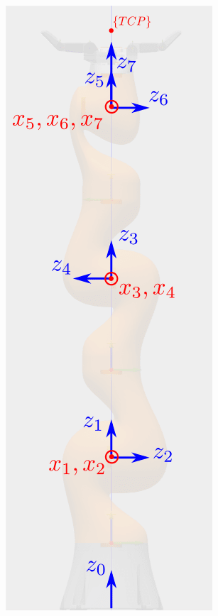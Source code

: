 \begin{frame}
\begin{columns}
\begin{figure}[htbp]
\includegraphics[width=\textwidth]{../images/iiwa-frames.png}
\end{figure}
\end{columns}
\end{frame}


